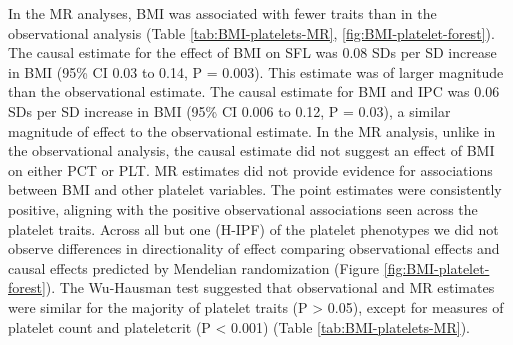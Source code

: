 \documentclass[11pt,twoside]{bristolthesis}
\begin{document}
In the MR analyses, BMI was associated with fewer traits than in the observational analysis (Table \ref{tab:BMI-platelets-MR}, \ref{fig:BMI-platelet-forest}). The causal estimate for the effect of BMI on SFL was 0.08 SDs per SD increase in BMI (95\% CI 0.03 to 0.14, P = 0.003). This estimate was of larger magnitude than the observational estimate. The causal estimate for BMI and IPC was 0.06 SDs per SD increase in BMI (95\% CI 0.006 to 0.12, P = 0.03), a similar magnitude of effect to the observational estimate. In the MR analysis, unlike in the observational analysis, the causal estimate did not suggest an effect of BMI on either PCT or PLT. MR estimates did not provide evidence for associations between BMI and other platelet variables. The point estimates were consistently positive, aligning with the positive observational associations seen across the platelet traits. Across all but one (H-IPF) of the platelet phenotypes we did not observe differences in directionality of effect comparing observational effects and causal effects predicted by Mendelian randomization (Figure \ref{fig:BMI-platelet-forest}).
The Wu-Hausman test suggested that observational and MR estimates were similar for the majority of platelet traits (P \textgreater{} 0.05), except for measures of platelet count and plateletcrit (P \textless{} 0.001) (Table \ref{tab:BMI-platelets-MR}).
\end{document}
